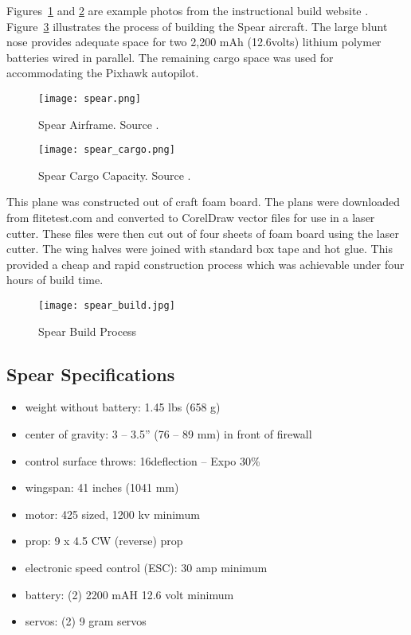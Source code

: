 Figures~\ref{fig:spear} and \ref{fig:spear_cargo} are example photos from the instructional build website \cite{flitetest}.  Figure~\ref{fig:spear_build} illustrates the process of building the Spear aircraft.  The large blunt nose provides adequate space for two 2,200 mAh (12.6volts) lithium polymer batteries wired in parallel.  The remaining cargo space was used for accommodating the Pixhawk autopilot.

\begin{figure}[!h]
 \centering
  \texttt{[image: spear.png]}
  \caption{Spear Airframe.  Source \cite{flitetest}.}
  \label{fig:spear}
\end{figure}

\begin{figure}[!h]
 \centering
  \texttt{[image: spear\_cargo.png]}
  \caption{Spear Cargo Capacity.  Source \cite{flitetest}.}
  \label{fig:spear_cargo}
\end{figure}

This plane was constructed out of craft foam board.  The plans were downloaded from flitetest.com\cite{flitetest} and converted to CorelDraw vector files for use in a laser cutter.  These files were then cut out of four sheets of foam board using the laser cutter.  The wing halves were joined with standard box tape and hot glue.  This provided a cheap and rapid construction process which was achievable under four hours of build time.

\begin{figure}[!h]
 \centering
  \texttt{[image: spear\_build.jpg]}
  \caption{Spear Build Process}
  \label{fig:spear_build}
\end{figure}

\subsection{Spear Specifications}
\begin{itemize}
 \item weight without battery: 1.45 lbs (658 g)
 \item center of gravity: 3 – 3.5” (76 – 89 mm) in front of firewall
 \item control surface throws: 16\degrees  deflection – Expo 30\%
 \item wingspan: 41 inches (1041 mm)
 \item motor: 425 sized, 1200 kv minimum
 \item prop: 9 x 4.5 CW (reverse) prop
 \item electronic speed control (ESC): 30 amp minimum
 \item battery: (2) 2200 mAH 12.6 volt minimum
 \item servos: (2) 9 gram servos 
\end{itemize}

